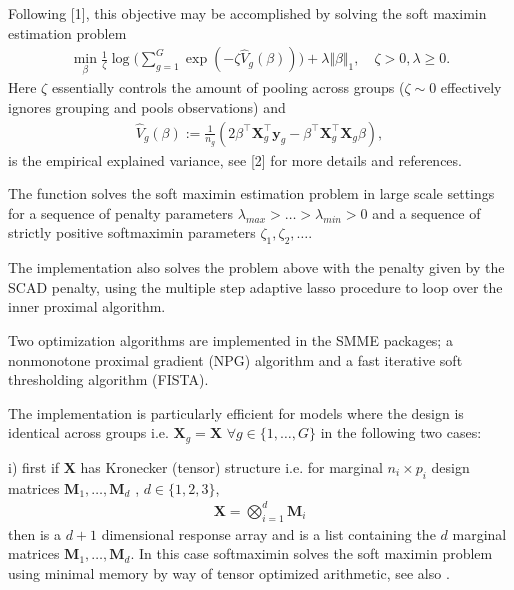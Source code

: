 \documentclass[letterpaper,10pt,english]{sphinxmanual}
\begin{document}
\begin{fulllineitems}
\sphinxAtStartPar
Following {[}1{]}, this objective may be accomplished by
solving the soft maximin estimation problem
\begin{equation*}
\begin{split}\min_{\beta}\frac{1}{\zeta}\log\bigg(\sum_{g = 1}^G \exp(-\zeta \hat V_g(\beta))\bigg) + \lambda  \Vert\beta\Vert_1, \quad \zeta > 0,\lambda \geq 0.\end{split}
\end{equation*}
\sphinxAtStartPar
Here \(\zeta\) essentially controls the amount of pooling across groups
(\(\zeta \sim 0\) effectively ignores grouping and pools observations) and
\begin{equation*}
\begin{split}\hat V_g(\beta):=\frac{1}{n_g}(2\beta^\top \mathbf{X}_g^\top \mathbf{y}_g -\beta^\top \mathbf{X}_g^\top \mathbf{X}_g\beta),\end{split}
\end{equation*}
\sphinxAtStartPar
is the empirical explained variance, see {[}2{]} for more
details and references.

\sphinxAtStartPar
The function   solves the soft maximin estimation problem in
large scale settings for a sequence of penalty parameters
\(\lambda_{max}>\ldots >\lambda_{min}>0\) and a sequence of strictly positive
softmaximin  parameters \(\zeta_1, \zeta_2,\ldots\).

\sphinxAtStartPar
The implementation also solves the
problem above with the penalty given by the SCAD penalty, using the multiple
step adaptive lasso procedure to loop over the inner proximal algorithm.

\sphinxAtStartPar
Two optimization algorithms  are implemented in the SMME packages;
a non\sphinxhyphen{}monotone proximal gradient (NPG) algorithm and a fast iterative soft
thresholding algorithm (FISTA).

\sphinxAtStartPar
The implementation is particularly efficient for models where the design is
identical across groups i.e. \(\mathbf{X}_g = \mathbf{X}\)
\(\forall g \in \{1, \ldots, G\}\) in the following two cases:

\sphinxAtStartPar
i) first if \(\mathbf{X}\) has Kronecker (tensor) structure i.e. for marginal \(n_i\times p_i\) design matrices \(\mathbf{M}_1,\ldots, \mathbf{M}_d\)
, \(d \in \{ 1, 2, 3\}\),
\begin{equation*}
\begin{split}\mathbf{X} = \bigotimes_{i=1}^d \mathbf{M}_i \end{split}
\end{equation*}
\sphinxAtStartPar
then  is a \(d + 1\) dimensional response array
and     is a list containing the \(d\) marginal matrices
\(\mathbf{M}_1,\ldots, \mathbf{M}_d\). In this case  softmaximin solves
the soft maximin problem using minimal memory by way of tensor optimized
arithmetic, see also   .


\end{fulllineitems}
\end{document}
